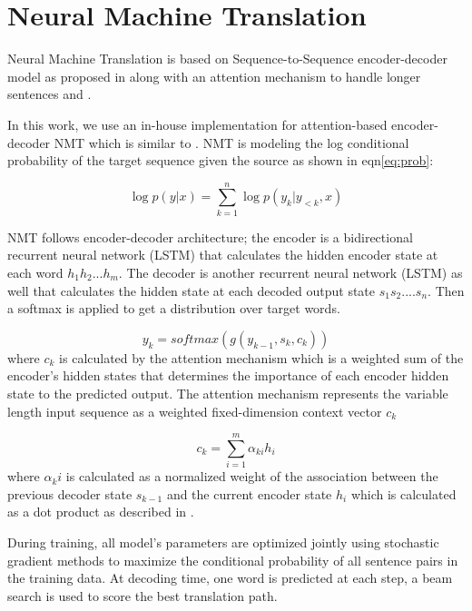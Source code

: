 \documentclass[a4paper]{article}
\begin{document}
\section{Neural Machine Translation}
\label{sec:nmt}
Neural Machine Translation is based on Sequence-to-Sequence encoder-decoder model as proposed in \cite{SutskeverVL14}  along with an attention mechanism to handle longer sentences \cite{BahdanauCB14} and \cite{LuongPM15}. 

In this work, we use an  in-house implementation \cite{jacob}  for attention-based encoder-decoder NMT which is similar to \cite{BahdanauCB14}. NMT is modeling the log conditional probability of the target sequence given the source as shown in eqn\ref{eq:prob}:

\begin{equation}
\log p(y|x) = \sum_{k=1}^n \log p(y_k|y_{<k},x)
\label{eq:prob}
\end{equation}


 NMT follows encoder-decoder architecture; the encoder is a bidirectional recurrent neural network (LSTM) that calculates the hidden encoder state at each word $h_1 h_2... h_m$. The decoder is another  recurrent neural network (LSTM) as well that calculates the hidden state at each decoded output state $s_1 s_2 .... s_n$. Then a softmax is applied to get a distribution over target words.



\begin{equation}
 y_k = softmax(g(y_{k-1},s_k, c_k))
\label{eq:y}
\end{equation}
where $c_k$ is calculated  by the attention mechanism which is a weighted sum of the encoder's hidden states that determines  the importance of each encoder  hidden state to the predicted output. The attention mechanism represents  the variable length input sequence as a weighted fixed-dimension context vector $c_k$
 
\begin{equation}
c_k = \sum_{i=1}^m \alpha_{ki} h_i
\label{eq:attn}
\end{equation}
where $\alpha_ki$ is calculated as a normalized weight of the association between the previous decoder state $s_{k-1}$ and the current encoder state $h_i$  which is calculated as a dot product as described in \cite{LuongPM15}.

During  training, all model's parameters are optimized jointly using stochastic gradient methods to maximize the conditional probability of all sentence pairs in the training data. At decoding time, one word is predicted at each step, a beam search is used to score the best translation path. 
\end{document}
